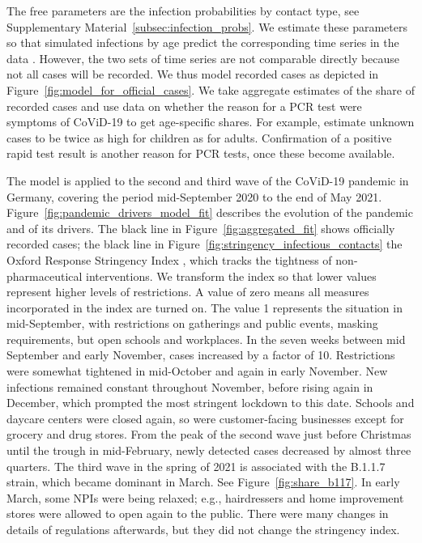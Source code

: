 The free parameters are the infection probabilities by contact type, see Supplementary
Material~\ref{subsec:infection_probs}. We estimate these parameters so that simulated
infections by age predict the corresponding time series in the data \citep[See][for the
general method]{McFadden1989}. However, the two sets of time series are not comparable
directly because not all cases will be recorded. We thus model recorded cases as depicted
in Figure~\ref{fig:model_for_official_cases}. We take aggregate estimates of the share of
recorded cases and use data on whether the reason for a PCR test were symptoms of
CoViD-19 to get age-specific shares. For example, estimate unknown cases to be twice as high for
children as for adults. Confirmation of a positive rapid test result is another reason
for PCR tests, once these become available.

The model is applied to the second and third wave of the CoViD-19 pandemic in Germany,
covering the period mid-September 2020 to the end of May 2021.
Figure~\ref{fig:pandemic_drivers_model_fit} describes the evolution of the pandemic and
of its drivers. The black line in Figure~\ref{fig:aggregated_fit} shows officially
recorded cases; the black line in Figure~\ref{fig:stringency_infectious_contacts} the Oxford Response
Stringency Index \citep{Hale2020}, which tracks the tightness of non-pharmaceutical
interventions. We transform the index so that lower values represent higher levels of
restrictions. A value of zero means all measures incorporated in the index are turned
on. The value 1 represents the situation in mid-September, with restrictions on
gatherings and public events, masking requirements, but open schools and workplaces. In
the seven weeks between mid September and early November, cases increased by a factor of
10. Restrictions were somewhat tightened in mid-October and again in early November. New
infections remained constant throughout November, before rising again in December, which
prompted the most stringent lockdown to this date. Schools and daycare centers were
closed again, so were customer-facing businesses except for grocery and drug stores.
From the peak of the second wave just before Christmas until the trough in mid-February,
newly detected cases decreased by almost three quarters. The third wave in the spring of
2021 is associated with the B.1.1.7 strain, which became dominant in March. See
Figure~\ref{fig:share_b117}. In early March, some NPIs were being relaxed; e.g.,
hairdressers and home improvement stores were allowed to open again to the public. There
were many changes in details of regulations afterwards, but they did not change the
stringency index.

